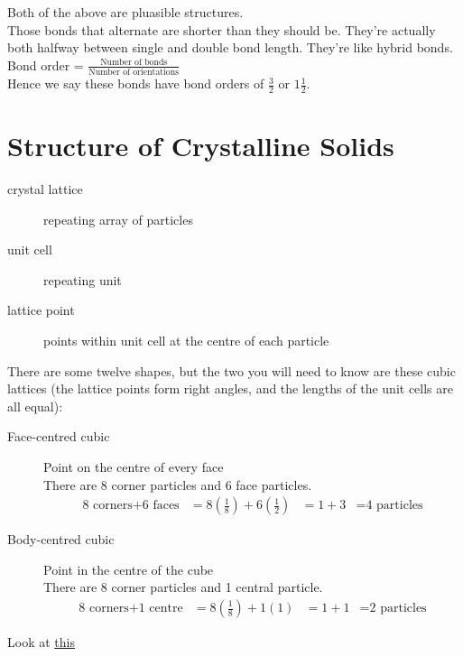 \documentclass[a4paper, 8pt]{memoir}
\begin{document}
Both of the above are pluasible structures. \\

Those bonds that alternate are shorter than they should be. They're actually both halfway between single and double bond length. They're like hybrid bonds. \\

Bond order = $\frac{\text{Number of bonds}}{\text{Number of orientations}}$ \\

Hence we say these bonds have bond orders of $\frac{3}{2}$ or $1\frac{1}{2}$. \\

\chapter{Structure of Crystalline Solids}
\begin{description}
\item[crystal lattice] repeating array of particles
\item[unit cell] repeating unit
\item[lattice point] points within unit cell at the centre of each particle
\end{description}

There are some twelve shapes, but the two you will need to know are these cubic lattices (the lattice points form right angles, and the lengths of the unit cells are all equal):
\begin{description}
\item[Face-centred cubic] Point on the centre of every face \\
There are 8 corner particles and 6 face particles. \\
\begin{align*}
\text{8 corners} + \text{6 faces} &= 8(\frac{1}{8}) + 6(\frac{1}{2})
&= 1 + 3
&= \text{4 particles}
\end{align*}
\item[Body-centred cubic] Point in the centre of the cube \\
There are 8 corner particles and 1 central particle. \\
\begin{align*}
\text{8 corners} + \text{1 centre} &= 8(\frac{1}{8}) + 1(1)
&= 1 + 1
&= \text{2 particles}
\end{align*}
\end{description}

Look at \href{http://bit.ly/101SXqL}{this} \\
\end{document}
